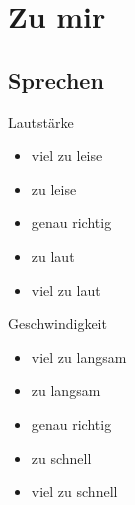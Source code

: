 \documentclass[11pt,a4paper,oneside]{scrartcl}
\begin{document}
\section{Zu mir}
\subsection{Sprechen}
Lautstärke
    \begin{itemize}
        \item viel zu leise
        \item zu leise
        \item genau richtig
        \item zu laut
        \item viel zu laut
    \end{itemize}

Geschwindigkeit
    \begin{itemize}
        \item viel zu langsam
        \item zu langsam
        \item genau richtig
        \item zu schnell
        \item viel zu schnell
    \end{itemize}
\end{document}
